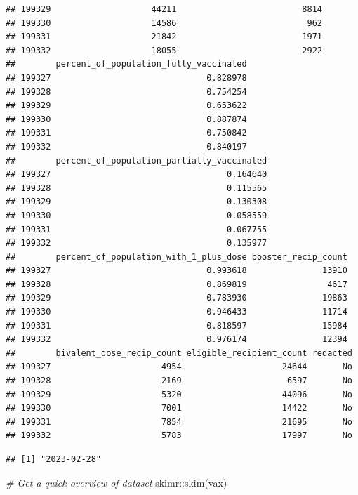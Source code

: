 \documentclass[
]{article}
\newenvironment{Shaded}{\begin{snugshade}}{\end{snugshade}}
\newcommand{\CommentTok}[1]{\textcolor[rgb]{0.56,0.35,0.01}{\textit{#1}}}
\newcommand{\FunctionTok}[1]{\textcolor[rgb]{0.00,0.00,0.00}{#1}}
\newcommand{\NormalTok}[1]{#1}
\newcommand{\SpecialCharTok}[1]{\textcolor[rgb]{0.00,0.00,0.00}{#1}}
\begin{document}
\begin{verbatim}
## 199329                    44211                         8814
## 199330                    14586                          962
## 199331                    21842                         1971
## 199332                    18055                         2922
##        percent_of_population_fully_vaccinated
## 199327                               0.828978
## 199328                               0.754254
## 199329                               0.653622
## 199330                               0.887874
## 199331                               0.750842
## 199332                               0.840197
##        percent_of_population_partially_vaccinated
## 199327                                   0.164640
## 199328                                   0.115565
## 199329                                   0.130308
## 199330                                   0.058559
## 199331                                   0.067755
## 199332                                   0.135977
##        percent_of_population_with_1_plus_dose booster_recip_count
## 199327                               0.993618               13910
## 199328                               0.869819                4617
## 199329                               0.783930               19863
## 199330                               0.946433               11714
## 199331                               0.818597               15984
## 199332                               0.976174               12394
##        bivalent_dose_recip_count eligible_recipient_count redacted
## 199327                      4954                    24644       No
## 199328                      2169                     6597       No
## 199329                      5320                    44096       No
## 199330                      7001                    14422       No
## 199331                      7854                    21695       No
## 199332                      5783                    17997       No
\end{verbatim}

\begin{Shaded}
\end{Shaded}

\begin{verbatim}
## [1] "2023-02-28"
\end{verbatim}

\begin{Shaded}
\begin{Highlighting}[]
\CommentTok{\# Get a quick overview of dataset}
\NormalTok{skimr}\SpecialCharTok{::}\FunctionTok{skim}\NormalTok{(vax)}
\end{Highlighting}
\end{Shaded}
\end{document}
